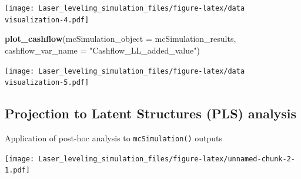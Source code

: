 \documentclass[
]{article}
\newenvironment{Shaded}{\begin{snugshade}}{\end{snugshade}}
\newcommand{\AttributeTok}[1]{\textcolor[rgb]{0.13,0.29,0.53}{#1}}
\newcommand{\CommentTok}[1]{\textcolor[rgb]{0.56,0.35,0.01}{\textit{#1}}}
\newcommand{\DecValTok}[1]{\textcolor[rgb]{0.00,0.00,0.81}{#1}}
\newcommand{\FunctionTok}[1]{\textcolor[rgb]{0.13,0.29,0.53}{\textbf{#1}}}
\newcommand{\NormalTok}[1]{#1}
\newcommand{\OtherTok}[1]{\textcolor[rgb]{0.56,0.35,0.01}{#1}}
\newcommand{\SpecialCharTok}[1]{\textcolor[rgb]{0.81,0.36,0.00}{\textbf{#1}}}
\newcommand{\StringTok}[1]{\textcolor[rgb]{0.31,0.60,0.02}{#1}}
\begin{document}
\texttt{[image: Laser\_leveling\_simulation\_files/figure-latex/data visualization-4.pdf]}

\begin{Shaded}
\begin{Highlighting}[]
\FunctionTok{plot\_cashflow}\NormalTok{(}\AttributeTok{mcSimulation\_object =}\NormalTok{ mcSimulation\_results, }\AttributeTok{cashflow\_var\_name =} \StringTok{"Cashflow\_LL\_added\_value"}\NormalTok{)}
\end{Highlighting}
\end{Shaded}

\texttt{[image: Laser\_leveling\_simulation\_files/figure-latex/data visualization-5.pdf]}

\hypertarget{projection-to-latent-structures-pls-analysis}{%
\subsection{Projection to Latent Structures (PLS)
analysis}\label{projection-to-latent-structures-pls-analysis}}

Application of post-hoc analysis to \texttt{mcSimulation()} outputs

\begin{Shaded}
\end{Shaded}

\texttt{[image: Laser\_leveling\_simulation\_files/figure-latex/unnamed-chunk-2-1.pdf]}
\end{document}
